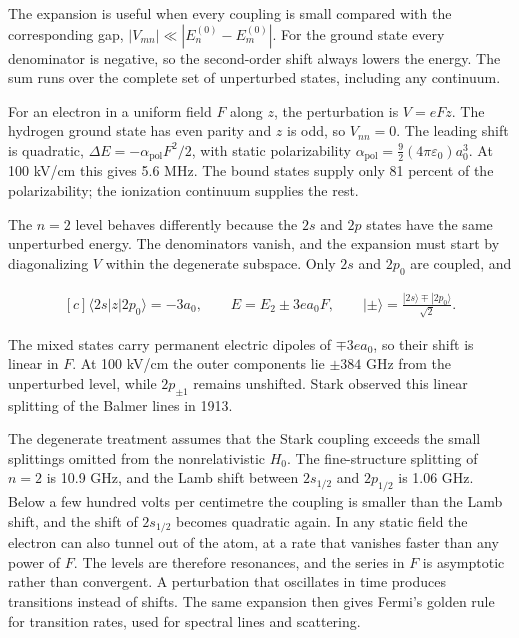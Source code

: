 \documentclass[11pt,oneside]{book}
\newenvironment{centeredalign}{\[\begin{gathered}[c]}{\end{gathered}\]}
\begin{document}
The expansion is useful when every coupling is small compared with the corresponding gap, \(|V_{mn}|\ll|E_n^{(0)}-E_m^{(0)}|\). For the ground state every denominator is negative, so the second-order shift always lowers the energy. The sum runs over the complete set of unperturbed states, including any continuum.

For an electron in a uniform field \(F\) along \(z\), the perturbation is \(V=eFz\). The hydrogen ground state has even parity and \(z\) is odd, so \(V_{nn}=0\). The leading shift is quadratic, \(\Delta E=-\alpha_{\mathrm{pol}}F^2/2\), with static polarizability \(\alpha_{\mathrm{pol}}=\tfrac92(4\pi\varepsilon_0)a_0^3\). At 100 kV/cm this gives 5.6 MHz. The bound states supply only 81 percent of the polarizability; the ionization continuum supplies the rest.

The \(n=2\) level behaves differently because the \(2s\) and \(2p\) states have the same unperturbed energy. The denominators vanish, and the expansion must start by diagonalizing \(V\) within the degenerate subspace. Only \(2s\) and \(2p_0\) are coupled, and

\begin{centeredalign}
\langle2s|z|2p_0\rangle=-3a_0,\qquad E=E_2\pm3ea_0F,\qquad
|\pm\rangle=\frac{|2s\rangle\mp|2p_0\rangle}{\sqrt2}.
\end{centeredalign}

The mixed states carry permanent electric dipoles of \(\mp3ea_0\), so their shift is linear in \(F\). At 100 kV/cm the outer components lie \(\pm384\) GHz from the unperturbed level, while \(2p_{\pm1}\) remains unshifted. Stark observed this linear splitting of the Balmer lines in 1913.

The degenerate treatment assumes that the Stark coupling exceeds the small splittings omitted from the nonrelativistic \(H_0\). The fine-structure splitting of \(n=2\) is 10.9 GHz, and the Lamb shift between \(2s_{1/2}\) and \(2p_{1/2}\) is 1.06 GHz. Below a few hundred volts per centimetre the coupling is smaller than the Lamb shift, and the shift of \(2s_{1/2}\) becomes quadratic again. In any static field the electron can also tunnel out of the atom, at a rate that vanishes faster than any power of \(F\). The levels are therefore resonances, and the series in \(F\) is asymptotic rather than convergent. A perturbation that oscillates in time produces transitions instead of shifts. The same expansion then gives Fermi's golden rule for transition rates, used for spectral lines and scattering.
\end{document}
